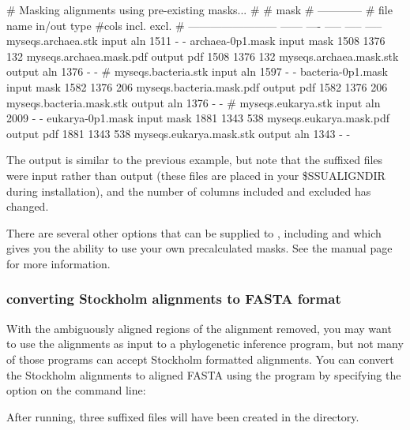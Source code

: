 
\begin{sreoutput}
# Masking alignments using pre-existing masks...
#
#                                                    mask    
#                                                ------------
# file name                 in/out  type  #cols  incl.  excl.
# ------------------------  ------  ----  -----  -----  -----
  myseqs.archaea.stk         input   aln   1511      -      -
  archaea-0p1.mask           input  mask   1508   1376    132
  myseqs.archaea.mask.pdf   output   pdf   1508   1376    132
  myseqs.archaea.mask.stk   output   aln   1376      -      -
#
  myseqs.bacteria.stk        input   aln   1597      -      -
  bacteria-0p1.mask          input  mask   1582   1376    206
  myseqs.bacteria.mask.pdf  output   pdf   1582   1376    206
  myseqs.bacteria.mask.stk  output   aln   1376      -      -
#
  myseqs.eukarya.stk         input   aln   2009      -      -
  eukarya-0p1.mask           input  mask   1881   1343    538
  myseqs.eukarya.mask.pdf   output   pdf   1881   1343    538
  myseqs.eukarya.mask.stk   output   aln   1343      -      -
\end{sreoutput}

The output is similar to the previous example, but note that the
 suffixed files were input rather than output (these files
are placed in your \$SSUALIGNDIR during installation), and the number
of columns included and excluded has changed.

There are several other options that can be supplied to
, including  and  which gives you the
ability to use your own precalculated masks. See the 
manual page for more information. 

\subsubsection{converting Stockholm alignments to FASTA format}
With the ambiguously aligned regions of the alignment removed, you may
want to use the alignments as input to a phylogenetic inference
program, but not many of those programs can accept Stockholm formatted
alignments. You can convert the Stockholm alignments to aligned FASTA
using the  program by specifying the 
option on the command line:


After running, three  suffixed files will have been created
in the  directory.
















